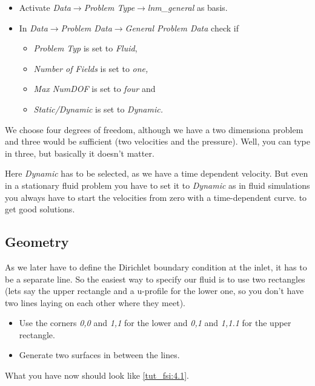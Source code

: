 \begin{itemize}
\item Activate \emph{Data$\to$Problem Type$\to$lnm\_general} as basis.
\item In \emph{Data$\to$Problem Data$\to$General Problem Data} check if 

\begin{itemize}
\item \emph{Problem Typ} is set to \emph{Fluid}, 
\item \emph{Number of Fields} is set to \emph{one,} 
\item \emph{Max NumDOF} is set to \emph{four} and 
\item \emph{Static/Dynamic} is set to \emph{Dynamic.}
\end{itemize}
\end{itemize}
We choose four degrees of freedom, although we have a two dimensiona
problem and three would be sufficient (two velocities and the pressure).
Well, you can type in three, but basically it doesn't matter. 

Here \emph{Dynamic} has to be selected, as we have a time dependent
velocity. But even in a stationary fluid problem you have to set it
to \emph{Dynamic} as in fluid simulations you always have to start
the velocities from zero with a time-dependent curve. to get good
solutions.


\subsection{Geometry}

As we later have to define the Dirichlet boundary condition at the
inlet, it has to be a separate line. So the easiest way to specify
our fluid is to use two rectangles (lets say the upper rectangle and
a u-profile for the lower one, so you don't have two lines laying
on each other where they meet).

\begin{itemize}
\item Use the corners \emph{0,0} and \emph{1,1} for the lower and \emph{0,1}
and \emph{1,1.1} for the upper rectangle.
\item Generate two surfaces in between the lines. 
\end{itemize}
What you have now should look like \ref{tut_fsi:4.1}.

